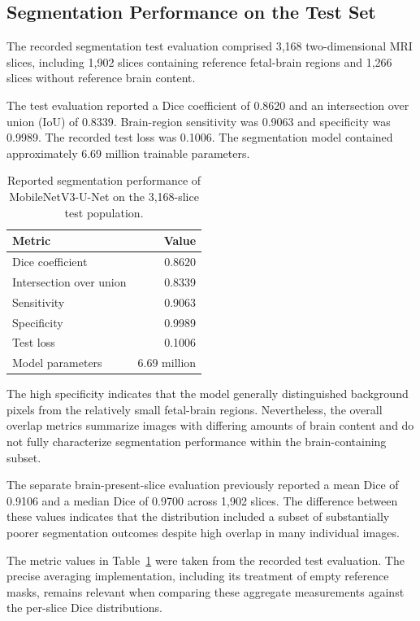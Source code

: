 \subsection{Segmentation Performance on the Test Set}
\label{subsec:results_2d_segmentation_test}

The recorded segmentation test evaluation comprised 3,168 two-dimensional MRI slices, including 1,902 slices containing reference fetal-brain regions and 1,266 slices without reference brain content.

The test evaluation reported a Dice coefficient of 0.8620 and an intersection over union (IoU) of 0.8339. Brain-region sensitivity was 0.9063 and specificity was 0.9989. The recorded test loss was 0.1006. The segmentation model contained approximately 6.69 million trainable parameters.

\begin{table}[htbp]
\centering
\caption{Reported segmentation performance of MobileNetV3-U-Net on the 3,168-slice test population.}
\label{tab:2d_segmentation_test_metrics}
\begin{tabular}{lr}
\hline
Metric & Value \\
\hline
Dice coefficient & 0.8620 \\
Intersection over union & 0.8339 \\
Sensitivity & 0.9063 \\
Specificity & 0.9989 \\
Test loss & 0.1006 \\
Model parameters & 6.69 million \\
\hline
\end{tabular}
\end{table}

The high specificity indicates that the model generally distinguished background pixels from the relatively small fetal-brain regions. Nevertheless, the overall overlap metrics summarize images with differing amounts of brain content and do not fully characterize segmentation performance within the brain-containing subset.

The separate brain-present-slice evaluation previously reported a mean Dice of 0.9106 and a median Dice of 0.9700 across 1,902 slices. The difference between these values indicates that the distribution included a subset of substantially poorer segmentation outcomes despite high overlap in many individual images.

The metric values in Table~\ref{tab:2d_segmentation_test_metrics} were taken from the recorded test evaluation. The precise averaging implementation, including its treatment of empty reference masks, remains relevant when comparing these aggregate measurements against the per-slice Dice distributions.

